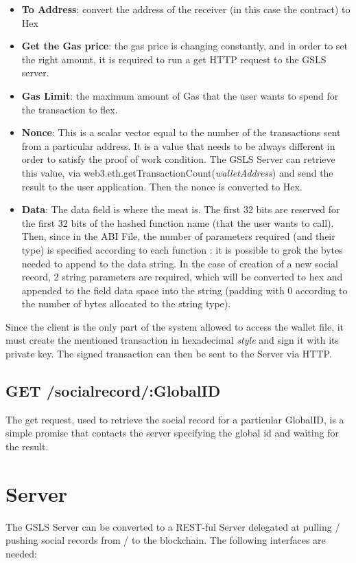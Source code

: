 \begin{itemize}
  \item \textbf{To Address}: convert the address of the receiver (in this case the contract) to Hex
  \item \textbf{Get the Gas price}: the gas price is changing constantly, and in order to set the right amount, it is required to run a get HTTP request to the GSLS server.
  \item \textbf{Gas Limit}: the maximum amount of Gas that the user wants to spend for the transaction to flex.
  \item \textbf{Nonce}: This is a scalar vector equal to the number of the transactions sent from a particular address. It is a value that needs to be always different in order to satisfy the proof of work condition.
  The GSLS Server can retrieve this value, via web3.eth.getTransactionCount(\textit{walletAddress}) and send the result to the user application. Then the nonce is converted to Hex.
  \item \textbf{Data}: The data field is where the meat is. The first 32 bits are reserved for the first 32 bits of the hashed function name (that the user wants to call).
  Then, since in the ABI File, the number of parameters required (and their type) is specified  according to each function : it is possible to grok the bytes needed to append to the data string.
  In the case of creation of a new social record, 2 string parameters are required, which will be converted to hex and appended to the field data space into the string (padding with 0 according to the number of bytes allocated to the string type).
\end{itemize}

Since the client is the only part of the system allowed to access the wallet file, it must create the mentioned transaction in hexadecimal \textit{style} and sign it with its private key.
The signed transaction can then be sent to the Server via HTTP.

\subsection{GET /socialrecord/:GlobalID}
The get request, used to retrieve the social record for a particular GlobalID, is a simple promise that contacts the server specifying the global id and waiting for the result.

\section{Server}
The GSLS Server can be converted to a REST-ful Server delegated at pulling / pushing social records from / to the blockchain.
The following interfaces are needed:
